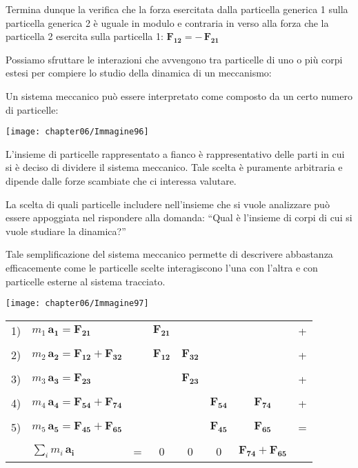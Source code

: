 	Termina dunque la verifica che la forza esercitata dalla particella generica 1 sulla particella generica 2 è uguale in modulo e contraria in verso alla forza che la particella 2 esercita sulla particella 1: $\mathbf{F_{12}} = -\,\mathbf{F_{21}} $
	
	Possiamo sfruttare le interazioni che avvengono tra particelle di uno o più corpi estesi per compiere lo studio della dinamica di un meccanismo:
	
	Un sistema meccanico può essere interpretato come composto da un certo numero di particelle:

	\begin{minipage}{.3\textwidth}
	\centering
	\texttt{[image: chapter06/Immagine96]}
	\end{minipage}
	\hfill
	\begin{minipage}{.65\textwidth}
	L'insieme di particelle rappresentato a fianco è rappresentativo delle parti in cui si è deciso di dividere il sistema meccanico. Tale scelta è puramente arbitraria e dipende dalle forze scambiate che ci interessa valutare.\newline
	
	La scelta di quali particelle includere nell'insieme che si vuole analizzare può essere appoggiata nel rispondere alla domanda: ``Qual è l'insieme di corpi di cui si vuole studiare la dinamica?''
	\end{minipage}
	
	Tale semplificazione del sistema meccanico permette di descrivere abbastanza efficacemente come le particelle scelte interagiscono l'una con l'altra e con particelle esterne al sistema tracciato.
	\vspace{2mm}
	
	\begin{minipage}{.35\textwidth}
	\texttt{[image: chapter06/Immagine97]}
	\end{minipage}
	\hfill
	\begin{minipage}{.65\textwidth}
	\begin{tabular}{llcccccr}
	1)& $m_1\,\mathbf{a_1} = \mathbf{F_{21}}$&& $\mathbf{F_{21}}$ & & & & +\\
	&&&&&&&\\
	2)& $m_2\,\mathbf{a_2} = \mathbf{F_{12}} + \mathbf{F_{32}}$& &$\mathbf{F_{12}}$ & $\mathbf{F_{32}}$&&&+\\
	&&&&&&&\\
	3)& $m_3\,\mathbf{a_3} = \mathbf{F_{23}}$&&&$\mathbf{F_{23}}$&&&+\\
	&&&&&&&\\
	4)& $m_4\,\mathbf{a_4} = \mathbf{F_{54}} + \mathbf{F_{74}}$&&&&$\mathbf{F_{54}}$&$\mathbf{F_{74}}$&+\\
	&&&&&&&\\
	5)& $m_5\,\mathbf{a_5} = \mathbf{F_{45}} + \mathbf{F_{65}}$&&&&$\mathbf{F_{45}}$&$\mathbf{F_{65}}$&=\\
	\midrule
	&&&&&&&\\
	&$\sum_i m_i\,\mathbf{a_i}$&=&0&0&0&$\mathbf{F_{74}}+\mathbf{F_{65}}$
	\end{tabular}
	\end{minipage}
	
